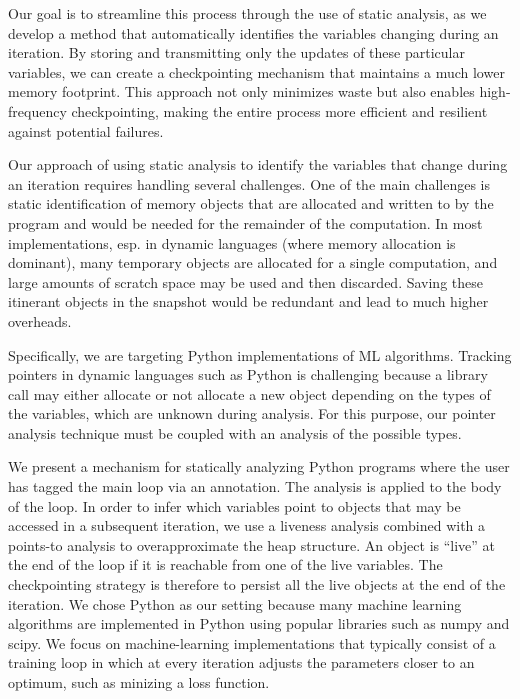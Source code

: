 Our goal is to streamline this process through the use of static analysis, as we develop a method that automatically identifies the variables changing during an iteration. By storing and transmitting only the updates of these particular variables, we can create a checkpointing mechanism that maintains a much lower memory footprint. This approach not only minimizes waste but also enables high-frequency checkpointing, making the entire process more efficient and resilient against potential failures.


Our approach of using static analysis to identify the variables that change during an iteration requires handling several challenges. One of the main challenges is static identification of
memory objects that are allocated and written to by the program and would be needed for the remainder of the computation.
In most implementations, esp. in dynamic languages (where memory allocation is dominant), many temporary objects are allocated for a single computation, and large amounts of scratch space may be used and then discarded.
Saving these itinerant objects in the snapshot would be redundant and lead to much higher overheads.

Specifically, we are targeting Python implementations of ML algorithms.
Tracking pointers in dynamic languages such as Python is challenging because a library call may either allocate or not allocate a new object depending on the types of the variables, which are unknown during analysis.
For this purpose, our pointer analysis technique must be coupled with an analysis of the possible types.



We present a mechanism for statically analyzing Python programs
where the user has tagged the main loop via an annotation.
The analysis is applied to the body of the loop.
In order to infer which variables point to objects that may be
accessed in a subsequent iteration, we use a liveness analysis
combined with a points-to analysis to overapproximate the heap
structure.
An object is ``live''  at the end
of the loop if it is reachable from one of the live variables.
The checkpointing strategy is therefore to persist all the live
objects at the end of the iteration.
We chose Python as our setting because many machine learning algorithms are implemented in Python 
using popular libraries such as numpy and scipy.
We focus on machine-learning implementations that typically consist of a training loop in which
at every iteration adjusts the parameters closer to an optimum, such as minizing a loss function.
